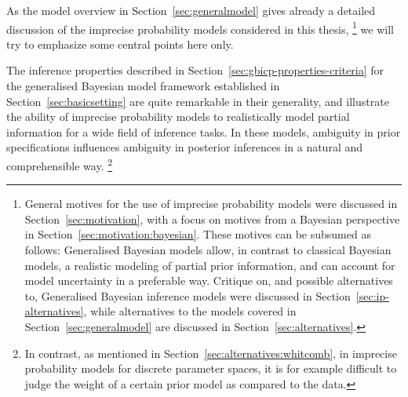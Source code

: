 As the model overview in Section~\ref{sec:generalmodel} gives already a detailed discussion
of the imprecise probability models considered in this thesis,%
\footnote{General motives for the use of imprecise probability models
were discussed in Section~\ref{sec:motivation},
with a focus on motives from a Bayesian perspective in Section~\ref{sec:motivation:bayesian}.
These motives can be subsumed as follows:
Generalised Bayesian models allow, in contrast to classical Bayesian models,
a realistic modeling of partial prior information,
and can account for model uncertainty in a preferable way.
Critique on, and possible alternatives to, Generalised Bayesian inference models
were discussed in Section~\ref{sec:ip-alternatives},
while alternatives to the models covered in Section~\ref{sec:generalmodel} are discussed in Section~\ref{sec:alternatives}.}
we will try to emphasize some central points here only.

The inference properties described in Section~\ref{sec:gbicp-properties-criteria}
for the generalised Bayesian model framework established in Section~\ref{sec:basicsetting}
are quite remarkable in their generality,
and illustrate the ability of imprecise probability models to realistically model partial information
for a wide field of inference tasks.
In these models, ambiguity in prior specifications influences ambiguity in posterior inferences
in a natural and comprehensible way.%
\footnote{In contrast, as mentioned in Section~\ref{sec:alternatives:whitcomb},
in imprecise probability models for discrete parameter spaces,
it is for example difficult to judge the weight of a certain prior model as compared to the data.}

